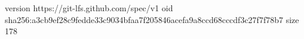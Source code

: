 version https://git-lfs.github.com/spec/v1
oid sha256:a3cb9ef28c9fedde33c9034bfaa7f205846acefa9a8ccd68cccdf3c27f7f78b7
size 178
